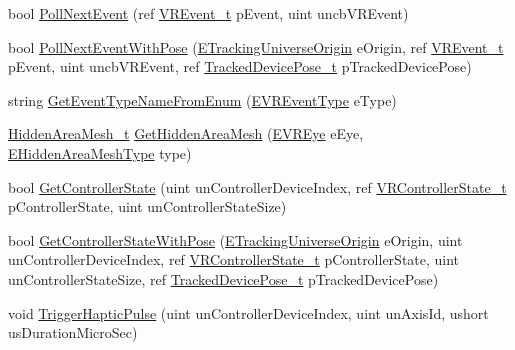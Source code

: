 \begin{DoxyCompactItemize}
\item 
bool \mbox{\hyperlink{class_valve_1_1_v_r_1_1_c_v_r_system_a1680564a6dab625afe34b14d4920a263}{Poll\+Next\+Event}} (ref \mbox{\hyperlink{struct_valve_1_1_v_r_1_1_v_r_event__t}{V\+R\+Event\+\_\+t}} p\+Event, uint uncb\+V\+R\+Event)
\item 
bool \mbox{\hyperlink{class_valve_1_1_v_r_1_1_c_v_r_system_a95d7cf29714d23acf0e6a6748370e788}{Poll\+Next\+Event\+With\+Pose}} (\mbox{\hyperlink{namespace_valve_1_1_v_r_a29be99a3c2f780157bd490db06a7f12f}{E\+Tracking\+Universe\+Origin}} e\+Origin, ref \mbox{\hyperlink{struct_valve_1_1_v_r_1_1_v_r_event__t}{V\+R\+Event\+\_\+t}} p\+Event, uint uncb\+V\+R\+Event, ref \mbox{\hyperlink{struct_valve_1_1_v_r_1_1_tracked_device_pose__t}{Tracked\+Device\+Pose\+\_\+t}} p\+Tracked\+Device\+Pose)
\item 
string \mbox{\hyperlink{class_valve_1_1_v_r_1_1_c_v_r_system_af1e8543cb021f7215c6252db5c0b5e3d}{Get\+Event\+Type\+Name\+From\+Enum}} (\mbox{\hyperlink{namespace_valve_1_1_v_r_afe3398b9e5cb1ea06335142d1b9289f3}{E\+V\+R\+Event\+Type}} e\+Type)
\item 
\mbox{\hyperlink{struct_valve_1_1_v_r_1_1_hidden_area_mesh__t}{Hidden\+Area\+Mesh\+\_\+t}} \mbox{\hyperlink{class_valve_1_1_v_r_1_1_c_v_r_system_a8fe7073e6d0c927bc986388a935a48ca}{Get\+Hidden\+Area\+Mesh}} (\mbox{\hyperlink{namespace_valve_1_1_v_r_a8153d4a3e627e1cede046327087c1880}{E\+V\+R\+Eye}} e\+Eye, \mbox{\hyperlink{namespace_valve_1_1_v_r_a2ed1af4858f23bc73d7358e8fcde5c64}{E\+Hidden\+Area\+Mesh\+Type}} type)
\item 
bool \mbox{\hyperlink{class_valve_1_1_v_r_1_1_c_v_r_system_ae999de6c51a207b9fe9e32e06ca34335}{Get\+Controller\+State}} (uint un\+Controller\+Device\+Index, ref \mbox{\hyperlink{struct_valve_1_1_v_r_1_1_v_r_controller_state__t}{V\+R\+Controller\+State\+\_\+t}} p\+Controller\+State, uint un\+Controller\+State\+Size)
\item 
bool \mbox{\hyperlink{class_valve_1_1_v_r_1_1_c_v_r_system_af7c299caf58916815c437b40c6ce6e12}{Get\+Controller\+State\+With\+Pose}} (\mbox{\hyperlink{namespace_valve_1_1_v_r_a29be99a3c2f780157bd490db06a7f12f}{E\+Tracking\+Universe\+Origin}} e\+Origin, uint un\+Controller\+Device\+Index, ref \mbox{\hyperlink{struct_valve_1_1_v_r_1_1_v_r_controller_state__t}{V\+R\+Controller\+State\+\_\+t}} p\+Controller\+State, uint un\+Controller\+State\+Size, ref \mbox{\hyperlink{struct_valve_1_1_v_r_1_1_tracked_device_pose__t}{Tracked\+Device\+Pose\+\_\+t}} p\+Tracked\+Device\+Pose)
\item 
void \mbox{\hyperlink{class_valve_1_1_v_r_1_1_c_v_r_system_a4fab070ac7de10c813b4d042a1d51fca}{Trigger\+Haptic\+Pulse}} (uint un\+Controller\+Device\+Index, uint un\+Axis\+Id, ushort us\+Duration\+Micro\+Sec)

\end{DoxyCompactItemize}
